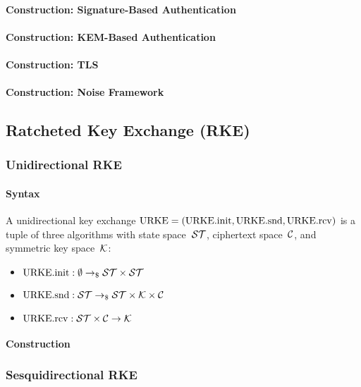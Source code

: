 \documentclass[a4paper,orivec]{llncs}
\begin{document}
\paragraph{Construction: Signature-Based Authentication}

\paragraph{Construction: KEM-Based Authentication}

\paragraph{Construction: TLS}

\paragraph{Construction: Noise Framework}


\subsection{Ratcheted Key Exchange (RKE)}

\subsubsection{Unidirectional RKE}

\paragraph{Syntax}
A unidirectional key exchange $\mathrm{URKE}=(\mathrm{URKE}.\mathrm{init},\mathrm{URKE}.\mathrm{snd},\mathrm{URKE}.\mathrm{rcv})$ is a tuple of three algorithms with state space~$\mathcal{ST}$, ciphertext space~$\mathcal{C}$, and symmetric key space~$\mathcal{K}$:

\begin{itemize}
    \item $\mathrm{URKE}.\mathrm{init}: \emptyset \to_\$ \mathcal{ST}\times\mathcal{ST}$
    \item $\mathrm{URKE}.\mathrm{snd}: \mathcal{ST} \to_\$ \mathcal{ST}\times\mathcal{K}\times\mathcal{C}$
    \item $\mathrm{URKE}.\mathrm{rcv}: \mathcal{ST}\times\mathcal{C} \to \mathcal{K}$
\end{itemize}

\paragraph{Construction}

\subsubsection{Sesquidirectional RKE}
\end{document}
